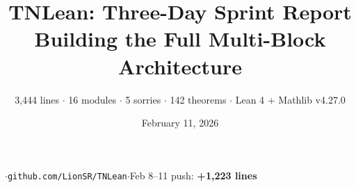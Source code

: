 \documentclass[aspectratio=169,10pt]{beamer}
\title{\textbf{TNLean: Three-Day Sprint Report\\Building the Full Multi-Block Architecture}}
\subtitle{{\small 3,444 lines $\cdot$ 16 modules $\cdot$ 5 sorries $\cdot$ 142 theorems  $\cdot$  Lean 4 + Mathlib v4.27.0}}
\date{February 11, 2026}
\author{}
\begin{document}
{%
\begin{frame}
\vspace{-1em}
\maketitle
\vspace{-2em}
\begin{center}
{\footnotesize \cite{Cirac2021Matrix}\quad$\cdot$\quad\texttt{github.com/LionSR/TNLean}\quad$\cdot$\quad Feb 8--11 push: \textbf{+1,223 lines}}
\end{center}
\end{frame}
}
\end{document}

